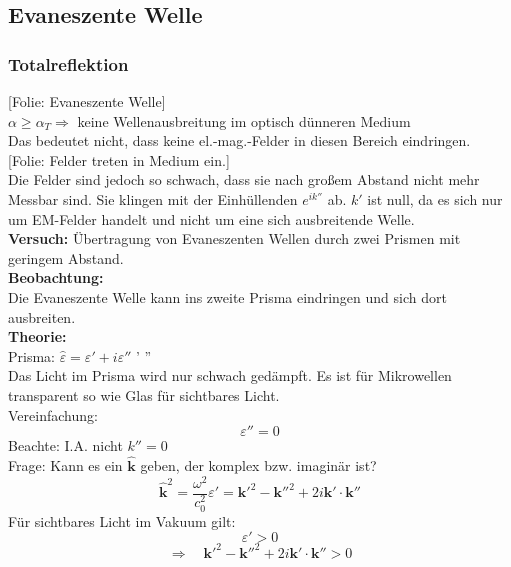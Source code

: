 \documentclass[titlepage,11pt,a4paper,ngerman]{report}
\newcommand{\folie}[1]{\color{gray}[Folie: #1]\color{black}}
\newcommand{\versuch}[1]{\color{red!50!black} \textbf{Versuch:} \color{black} #1\\ }
\renewcommand{\vec}[1]{\boldsymbol{#1}}
\newcommand{\lcom}[1]{\color{MidnightBlue}#1\color{black}}
\renewcommand{\epsilon}{\varepsilon}
\begin{document}

\subsection{Evaneszente Welle}

\subsubsection{Totalreflektion}

\folie{Evaneszente Welle}\\
$ \alpha \ge \alpha_T \Rightarrow $ keine Wellenausbreitung im optisch dünneren Medium\\[5pt]
Das bedeutet nicht, dass keine el.-mag.-Felder in diesen Bereich eindringen.\\
\folie{Felder treten in Medium ein.}\\
\lcom{Die Felder sind jedoch so schwach, dass sie nach großem Abstand nicht mehr Messbar sind. Sie klingen mit der Einhüllenden $ e^{i k''} $ ab. $ k' $ ist null, da es sich nur um EM-Felder handelt und nicht um eine sich ausbreitende Welle.}\\
\versuch{Übertragung von Evaneszenten Wellen durch zwei Prismen mit geringem Abstand.}
\textbf{Beobachtung:}\\
Die Evaneszente Welle kann ins zweite Prisma eindringen und sich dort ausbreiten.\\
\textbf{Theorie:}\\
Prisma: $ \hat{\epsilon} = \epsilon' + i \epsilon'' $ \qquad \epsilon' \gg \epsilon''\\
Das Licht im Prisma wird nur schwach gedämpft. Es ist für Mikrowellen transparent so wie Glas für sichtbares Licht.\\
Vereinfachung:
\begin{equation*}
\epsilon'' = 0
\end{equation*}
Beachte: I.A. nicht $ k'' = 0 $\\[5pt]
Frage: Kann es ein $ \hat{\vec{k}} $ geben, der komplex bzw. imaginär ist?
\begin{equation*}
\hat{\vec{k}}^2 = \frac{\omega^2}{c_0^2} \epsilon' = \vec{k}'^2 - \vec{k}''^2 + 2 i \vec{k}' \cdot \vec{k}''
\end{equation*}
Für sichtbares Licht im Vakuum gilt:
\begin{equation*}
\epsilon' > 0
\end{equation*}
\begin{equation*}
\Rightarrow \quad \vec{k}'^2 - \vec{k}''^2 + 2 i \vec{k}' \cdot \vec{k}'' > 0
\end{equation*}
\end{document}
